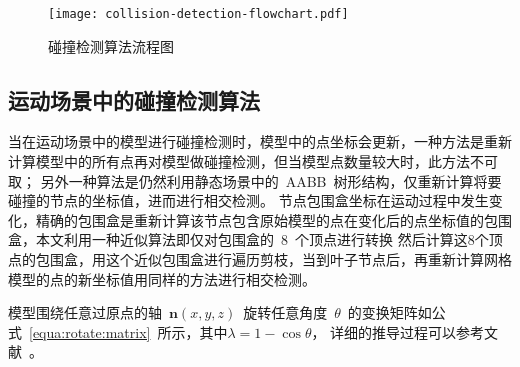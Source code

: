 \begin{figure}[htpb]
  \centering
  \texttt{[image: collision-detection-flowchart.pdf]}
  \caption{碰撞检测算法流程图}
  \label{fig:flowchart:cd}
\end{figure}

\subsection{运动场景中的碰撞检测算法}
\label{subsec:moving:cd}

当在运动场景中的模型进行碰撞检测时，模型中的点坐标会更新，一种方法是重新计算模型中的所有点再对模型做碰撞检测，但当模型点数量较大时，此方法不可取；
另外一种算法是仍然利用静态场景中的~AABB~树形结构，仅重新计算将要碰撞的节点的坐标值，进而进行相交检测。
节点包围盒坐标在运动过程中发生变化，精确的包围盒是重新计算该节点包含原始模型的点在变化后的点坐标值的包围盒，本文利用一种近似算法即仅对包围盒的~8~个顶点进行转换
然后计算这8个顶点的包围盒，用这个近似包围盒进行遍历剪枝，当到叶子节点后，再重新计算网格模型的点的新坐标值用同样的方法进行相交检测。

模型围绕任意过原点的轴~$\bm{n}(x, y,
z)$~旋转任意角度~$\theta$~的变换矩阵如公式~\ref{equa:rotate:matrix}~所示，其中$\lambda
= 1-\cos\theta$，
详细的推导过程可以参考文献~。

